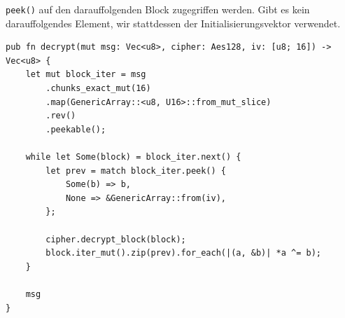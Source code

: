 \texttt{peek()} auf den darauffolgenden Block zugegriffen werden. 
Gibt es kein darauffolgendes Element, wir stattdessen der 
Initialisierungsvektor verwendet.
\begin{verbatim}
pub fn decrypt(mut msg: Vec<u8>, cipher: Aes128, iv: [u8; 16]) -> Vec<u8> {
    let mut block_iter = msg
        .chunks_exact_mut(16)
        .map(GenericArray::<u8, U16>::from_mut_slice)
        .rev()
        .peekable();

    while let Some(block) = block_iter.next() {
        let prev = match block_iter.peek() {
            Some(b) => b,
            None => &GenericArray::from(iv),
        };

        cipher.decrypt_block(block);
        block.iter_mut().zip(prev).for_each(|(a, &b)| *a ^= b);
    }

    msg
}
\end{verbatim} 


